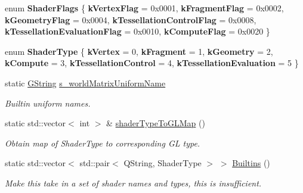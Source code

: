 \begin{DoxyCompactItemize}
\item 
\mbox{\label{classrev_1_1_shader_ad1502ceffd56153e6be0971c31f182c2}} 
enum {\bfseries Shader\+Flags} \{ \newline
{\bfseries k\+Vertex\+Flag} = 0x0001, 
{\bfseries k\+Fragment\+Flag} = 0x0002, 
{\bfseries k\+Geometry\+Flag} = 0x0004, 
{\bfseries k\+Tessellation\+Control\+Flag} = 0x0008, 
\newline
{\bfseries k\+Tessellation\+Evaluation\+Flag} = 0x0010, 
{\bfseries k\+Compute\+Flag} = 0x0020
 \}
\item 
\mbox{\label{classrev_1_1_shader_ae70209a4be381a3b747aaca1bcf2adc2}} 
enum {\bfseries Shader\+Type} \{ \newline
{\bfseries k\+Vertex} = 0, 
{\bfseries k\+Fragment} = 1, 
{\bfseries k\+Geometry} = 2, 
{\bfseries k\+Compute} = 3, 
\newline
{\bfseries k\+Tessellation\+Control} = 4, 
{\bfseries k\+Tessellation\+Evaluation} = 5
 \}
\item 
\mbox{\label{classrev_1_1_shader_ae5be348d673c9d03cb3a7731e66e12f7}} 
static \mbox{\hyperlink{classrev_1_1_g_string}{G\+String}} \mbox{\hyperlink{classrev_1_1_shader_ae5be348d673c9d03cb3a7731e66e12f7}{s\+\_\+world\+Matrix\+Uniform\+Name}}
\begin{DoxyCompactList}\small\item\em Builtin uniform names. \end{DoxyCompactList}\item 
static std\+::vector$<$ int $>$ \& \mbox{\hyperlink{classrev_1_1_shader_a5860cf399e4686718d5d6e1350778688}{shader\+Type\+To\+G\+L\+Map}} ()
\begin{DoxyCompactList}\small\item\em Obtain map of Shader\+Type to corresponding GL type. \end{DoxyCompactList}\item 
\mbox{\label{classrev_1_1_shader_ab12daa9ba86b2ed67a48d1c775d455c5}} 
static std\+::vector$<$ std\+::pair$<$ Q\+String, Shader\+Type $>$ $>$ \mbox{\hyperlink{classrev_1_1_shader_ab12daa9ba86b2ed67a48d1c775d455c5}{Builtins}} ()
\begin{DoxyCompactList}\small\item\em Make this take in a set of shader names and types, this is insufficient. \end{DoxyCompactList}\item 

\end{DoxyCompactItemize}
